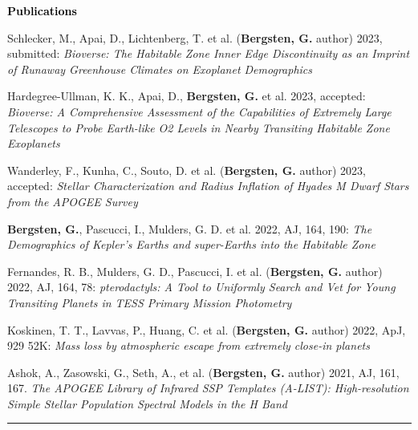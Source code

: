 \documentclass{resume} %
\newcommand{\mystrut}{\rule[-.3\baselineskip]{0pt}{\baselineskip}}
\newcommand{\cvline}[1]{\vspace*{\dimexpr-\parskip-0.3\baselineskip}\noindent\rule{\textwidth}{0.4pt}\vspace*{\dimexpr-0.3\parskip-0\baselineskip}}
\renewenvironment{rSection}[1]{\mystrut{\textcolor{black}{{\large{\textbf{#1}}}}}
\vspace{-5pt} %
\begin{list}{}{
\setlength{\leftmargin}{0em}
}
\item[]
}{
\end{list}
}
\begin{document}
\begin{rSection}{Publications} \itemsep -2pt
\begin{etaremune}[nosep]

\item{Schlecker, M., Apai, D., Lichtenberg, T. et al. (\textbf{Bergsten, G.}  author) 2023, submitted: \textit{Bioverse: The Habitable Zone Inner Edge Discontinuity as an Imprint of Runaway Greenhouse Climates on Exoplanet Demographics}}\vspace{-7pt}

\item{Hardegree-Ullman, K. K., Apai, D., \textbf{Bergsten, G.} et al. 2023, accepted: \textit{Bioverse: A Comprehensive Assessment of the Capabilities of Extremely Large Telescopes to Probe Earth-like O2 Levels in Nearby Transiting Habitable Zone Exoplanets}}\vspace{-7pt}

\item{Wanderley, F., Kunha, C., Souto, D. et al. (\textbf{Bergsten, G.}  author) 2023, accepted: \textit{Stellar Characterization and Radius Inflation of Hyades M Dwarf Stars from the APOGEE Survey}}\vspace{-7pt}

\item{\textbf{Bergsten, G.}, Pascucci, I., Mulders, G. D. et al. 2022, AJ, 164, 190: \textit{The Demographics of Kepler's Earths and super-Earths into the Habitable Zone}}\vspace{-7pt}

\item{Fernandes, R. B., Mulders, G. D., Pascucci, I. et al. (\textbf{Bergsten, G.}  author) 2022, AJ, 164, 78: \textit{pterodactyls: A Tool to Uniformly Search and Vet for Young Transiting Planets in TESS Primary Mission Photometry}}\vspace{-7pt}

\item{Koskinen, T. T., Lavvas, P., Huang, C. et al. (\textbf{Bergsten, G.}  author) 2022, ApJ, 929 52K: \textit{Mass loss by atmospheric escape from extremely close-in planets}}\vspace{-7pt}

\item{Ashok, A., Zasowski, G., Seth, A., et al. (\textbf{Bergsten, G.}  author) 2021, AJ, 161, 167. \textit{The APOGEE Library of Infrared SSP Templates (A-LIST): High-resolution Simple Stellar Population Spectral Models in the H Band}}

\end{etaremune}
\end{rSection}
\cvline{}
\end{document}
